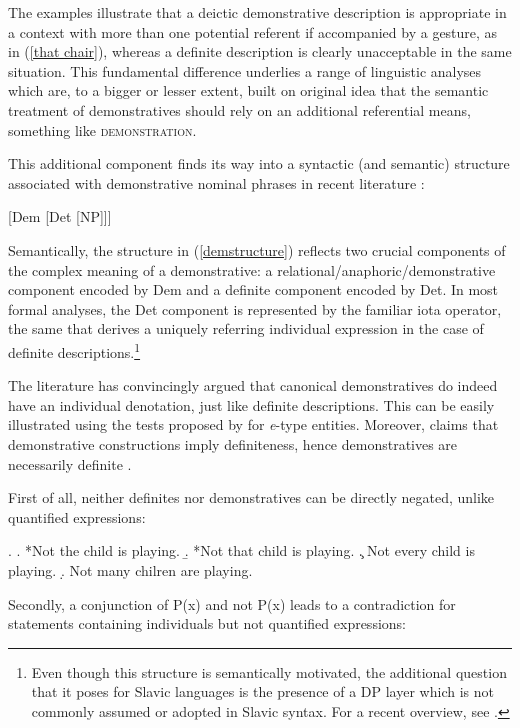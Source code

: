 \documentclass[output=paper,colorlinks,citecolor=brown]{langscibook}
\begin{document}
\noindent The examples illustrate that a deictic demonstrative description is appropriate in a context with more than one potential referent if accompanied by a gesture, as in (\ref{that chair}), whereas a definite description is clearly unacceptable in the same situation. This fundamental difference underlies a range of linguistic analyses which are, to a bigger or lesser extent, built on  original idea that the semantic treatment of demonstratives should rely on an additional referential means, something like \textsc{demonstration}. 

This additional component finds its way into a syntactic (and semantic) structure associated with demonstrative nominal phrases in recent literature \citep[e.g.][]{elbourne08, simonenko13, simik16}: 

\ea 	\label{demstructure}
[Dem [Det [NP]]] 
\z

\noindent Semantically, the structure in (\ref{demstructure}) reflects two crucial components of the complex meaning of a demonstrative: a relational/anaphoric/demonstrative component encoded by Dem and a definite component encoded by Det. In most formal analyses, the Det component is represented by the familiar iota operator, the same that derives a uniquely referring individual expression in the case of definite descriptions.\footnote{Even though this structure is semantically motivated, the additional question that it poses for Slavic languages is the presence of a DP layer which is not commonly assumed or adopted in Slavic syntax. For a recent overview, see \citet{geist21}.} 

\iffalse
The literature \citep[see, especially][]{elbourne08} has convincingly argued that canonical demonstratives do indeed have an individual denotation, just like definite descriptions. This can be easily illustrated using the tests proposed by \citet{lobner85} for \textit{e}-type entities. Moreover, \citet{lyons99} claims that demonstrative constructions imply definiteness, hence demonstratives are necessarily definite \citep[see][21]{lyons99}. 


First of all, neither definites nor demonstratives can be directly negated, unlike quantified expressions: 

\ex. 
\a. *Not the child is playing.
\b.	*Not that child is playing.
\c.	Not every child is playing. 
\d. 	Not many chilren are playing. 

Secondly, a conjunction of P(x) and not P(x) leads to a contradiction for statements containing individuals but not quantified expressions: 
\end{document}
